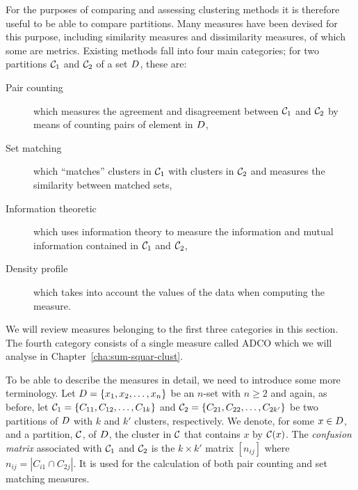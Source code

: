 For the purposes of comparing and assessing clustering methods it is therefore
useful to be able to compare partitions.  Many measures have been devised for
this purpose, including similarity measures and dissimilarity measures, of
which some are metrics.  Existing methods fall into four main categories; for
two partitions $\mathcal{C}_1$ and $\mathcal{C}_2$ of a set $D$, these are:
\begin{description}
\item[Pair counting] which measures the agreement and disagreement between
  $\mathcal{C}_1$ and $\mathcal{C}_2$ by means of counting pairs of element in $D$,
\item[Set matching] which ``matches'' clusters in $\mathcal{C}_1$ with clusters in
  $\mathcal{C}_2$ and measures the similarity between matched sets,
\item[Information theoretic] which uses information theory to measure the
  information and mutual information contained in $\mathcal{C}_1$ and $\mathcal{C}_2$,
\item[Density profile] which takes into account the values of the data when
  computing the measure.
\end{description}

We will review measures belonging to the first three categories in this
section.  The fourth category consists of a single measure called ADCO which
we will analyse in Chapter~\ref{cha:sum-squar-clust}.

To be able to describe the measures in detail, we need to introduce some more
terminology.  Let $D = \{x_1,x_2,\dotsc,x_n\}$ be an $n$-set with $n \geq
2$ and again, as before, let $\mathcal{C}_1 = \{C_{11},C_{12},\dotsc,C_{1k}\}$ and
$\mathcal{C}_2 = \{C_{21},C_{22},\dotsc,C_{2k'}\}$ be two partitions of $D$ with
$k$ and $k'$ clusters, respectively.  We denote, for some $x \in D$, and a
partition, $\mathcal{C}$, of $D$, the cluster in $\mathcal{C}$ that contains $x$ by
$\mathcal{C}(x)$.  The \textit{confusion matrix} associated with $\mathcal{C}_1$ and
$\mathcal{C}_2$ is the $k \times k'$ matrix $[n_{ij}]$ where $n_{ij} = |C_{i1} \cap
C_{2j}|$.  It is used for the calculation of both pair counting and set
matching measures.

